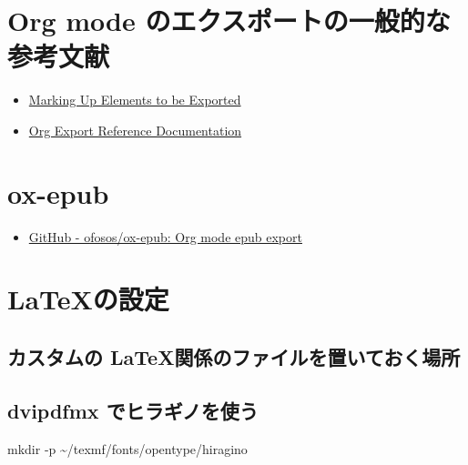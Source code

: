 \documentclass[a4j,12pt,openany,uplatex,dvipdfmx]{jsbook}
\begin{document}
\chapter{Org mode のエクスポートの一般的な参考文献}
\label{sec:org240de17}
\begin{itemize}
\item \href{https://orgmode.org/worg/exporters/filter-markup.html}{Marking Up Elements to be Exported}
\item \href{https://orgmode.org/worg/dev/org-export-reference.html}{Org Export Reference Documentation}
\end{itemize}


\chapter{ox-epub}
\label{sec:org446cbf9}
\begin{itemize}
\item \href{https://github.com/ofosos/ox-epub}{GitHub - ofosos/ox-epub: Org mode epub export}
\end{itemize}


\chapter{\LaTeX の設定}
\label{sec:org3591550}


\section{カスタムの \LaTeX 関係のファイルを置いておく場所}
\label{sec:org23375be}

\section{dvipdfmx でヒラギノを使う}
\label{sec:orgf91feca}


mkdir -p  \textasciitilde{}/texmf/fonts/opentype/hiragino
\end{document}
